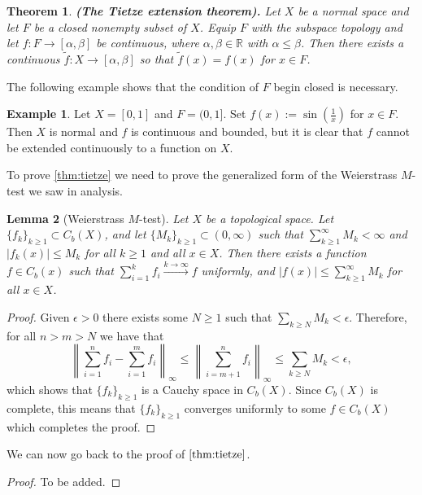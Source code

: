 \documentclass[11pt,a4paper]{article}
\theoremstyle{definition}
\newtheorem{example}{Example}[section]
\theoremstyle{plain}
\newtheorem{theorem}{Theorem}[section]
\newtheorem{lemma}[theorem]{Lemma}
\newcommand{\R}{\mathbb{R}}
\newcommand{\abs}[1]{\left\lvert #1\right\rvert}
\newcommand{\norm}[1]{\left\lVert #1\right\rVert}
\renewcommand{\tt}[1]{\textnormal{\textbf{(#1).}}} %
\begin{document}
  \begin{theorem}\label{thm:tietze}\tt{The Tietze extension theorem}
    Let $X$ be a normal space and let $F$ be a closed nonempty subset of $X$.
    Equip $F$ with the subspace topology
    and let $f \colon F \to [\alpha, \beta]$ be continuous,
    where $\alpha, \beta \in \R$ with $\alpha \le \beta$.
    Then there exists a continuous $\tilde{f} \colon X \to [\alpha, \beta]$
    so that $\tilde{f}(x) = f(x)$ for $x \in F$.
  \end{theorem}
  
  The following example shows that the condition of $F$ begin closed is
  necessary.

  \begin{example}
    Let $X = [0,1]$ and $F = (0,1]$.
    Set $f(x) := \sin\left(\frac {1}{x}\right)$ for $x \in F$.
    Then $X$ is normal and $f$ is continuous and bounded, but it is clear
    that $f$ cannot be extended continuously to a function on $X$.
  \end{example}

  To prove \autoref{thm:tietze} we need to prove the generalized form
  of the Weierstrass $M$-test we saw in analysis.

  \begin{lemma}[Weierstrass $M$-test]\label{lem:m-test}
    Let $X$ be a topological space. Let $\{f_k\}_{k \geq 1} \subset C_b(X)$,
    and let $\{M_k\}_{k \geq 1} \subset (0,\infty)$ such that
    $\sum_{k \geq 1}^{\infty} M_k < \infty$ and
    $\abs{f_k(x)} \le M_k$ for all $k \geq 1$ and all $x \in X$.
    Then there exists a function $f \in C_b(x)$ such that
    $\sum_{i=1}^{k} f_i \xrightarrow{k \to \infty} f$ uniformly, and
    $\abs{f(x)} \le \sum_{k \geq 1}^{\infty} M_k$ for all $x \in X$.
  \end{lemma}
  \begin{proof}
    Given $\epsilon > 0$ there exists some $N \geq 1$ such that
    $\sum_{k \geq N} M_k < \epsilon$. Therefore, for all $n > m > N$
    we have that
    \[
      \norm{\sum_{i=1}^{n} f_i - \sum_{i=1}^{m} f_i}_{\infty} \le
      \norm{\sum_{i=m+1}^{n} f_i}_{\infty} \le
      \sum_{k \geq N} M_k <
      \epsilon,
    \]
    which shows that $\{f_k\}_{k \geq 1}$ is a Cauchy space in $C_b(X)$.
    Since $C_b(X)$ is complete, this means that $\{f_k\}_{k \geq 1}$ converges
    uniformly to some $f \in C_b(X)$ which completes the proof.
  \end{proof}
  
  We can now go back to the proof of $\autoref{thm:tietze}$.
  \begin{proof}
    To be added.
  \end{proof}
  
\end{document}

